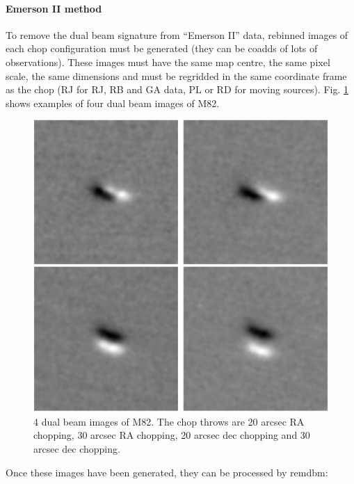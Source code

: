 \documentclass[twoside,11pt]{article}
\newcommand{\task}[1]{{\sf #1}}
\newcommand{\remdbm}{\htmlref{\task{remdbm}}{REMDBM}}
\newcommand{\htmlref}[2]{#1}
\renewcommand{\_}{\texttt{\symbol{95}}}
\begin{document}
\paragraph{Emerson II method}

To remove the dual beam signature from ``Emerson II'' data,
rebinned images of each chop configuration must be generated (they can
be coadds of lots of observations). These images must have the same
map centre, the same pixel scale, the same dimensions and must be 
regridded in the same coordinate frame as the chop (RJ for RJ, RB and GA 
data, PL or RD for moving sources). Fig. \ref{scan:chops} shows examples
of four dual beam images of M82.

\begin{figure}
\begin{center}
\includegraphics[width=\textwidth]{sun216_4chops.eps}
\caption{4 dual beam images of M82. The chop throws are 20 arcsec
RA chopping, 30 arcsec RA chopping, 20 arcsec dec chopping and
30 arcsec dec chopping.
}
\label{scan:chops}
\end{center}
\end{figure}

Once these images have been generated, they can be processed by 
\remdbm:
\end{document}
